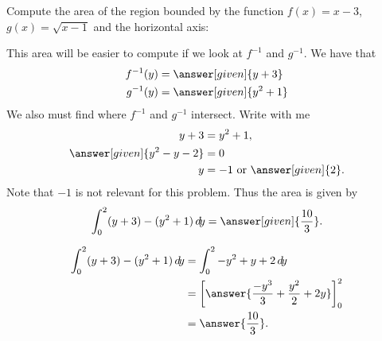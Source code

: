 \documentclass{ximera}
\begin{document}
\begin{example}
  Compute the area of the region bounded by the function $f(x) = x-3$,
  $g(x) = \sqrt{x-1}$ and the horizontal axis:
\begin{image}
\end{image}
\begin{explanation}
  This area will be easier to compute if we look at $f^{-1}$ and $g^{-1}$. We have that
  \begin{align*}
    f^{-1}(y) &= \answer[given]{y+3}\\
    g^{-1}(y) &= \answer[given]{y^2 +1}
  \end{align*}
  We also must find where $f^{-1}$ and $g^{-1}$ intersect. Write with me
  \begin{align*}
    y+3 &= y^2 +1,\\
    \answer[given]{y^2-y-2} &= 0\\
    y &= -1 \text{ or }\answer[given]{2}.
  \end{align*}
  Note that $-1$ is not relevant for this problem.  Thus the area is
  given by
  \[
  \int_{0}^{2}(y+3) - (y^2+1)\d y = \answer[given]{\frac{10}{3}}.
  \]
  \begin{hint}
    \begin{align*}
      \int_0^2 (y+3) - (y^2+1) \d y &= \int_0^2 -y^2+y+2 \d y\\
      &=\eval{\answer{\frac{-y^3}{3} + \frac{y^2}{2}+2y}}_0^2\\
      &=\answer{\frac{10}{3}}.
    \end{align*}
  \end{hint}
\end{explanation}
\end{example}
\end{document}
